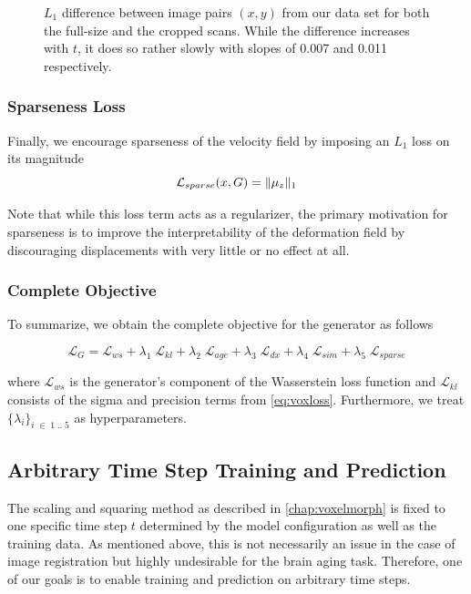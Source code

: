 \begin{figure}[h]
	\caption{$L_1$ difference between image pairs $(x, y)$ from our data set for both the full-size and the cropped scans. While the difference increases with $t$, it does so rather slowly with slopes of 0.007 and 0.011 respectively.}
	\label{fig:l1plots}
\end{figure}

\subsubsection*{Sparseness Loss}
Finally, we encourage sparseness of the velocity field by imposing an $L_1$ loss on its magnitude
\begin{equation}
	\mathcal{L}_{sparse}( x, G ) = \lVert\mu_z\rVert_1
\end{equation}

Note that while this loss term acts as a regularizer, the primary motivation for sparseness is to improve the interpretability of the deformation field by discouraging displacements with very little or no effect at all.

\subsubsection*{Complete Objective}
To summarize, we obtain the complete objective for the generator as follows

\begin{equation}
	\mathcal{L}_G =
		\mathcal{L}_{ws} +
		\lambda_{1} \; \mathcal{L}_{kl} +
		\lambda_{2} \; \mathcal{L}_{age} + 
		\lambda_{3} \; \mathcal{L}_{dx} + 
		\lambda_{4} \; \mathcal{L}_{sim} + 
		\lambda_{5} \; \mathcal{L}_{sparse}
\end{equation}

where $\mathcal{L}_{ws}$ is the generator's component of the Wasserstein loss function and $\mathcal{L}_{kl}$ consists of the sigma and precision terms from \autoref{eq:voxloss}. Furthermore, we treat $ \{ \lambda_i \}_{i\;\in\;1\;..\;5}$ as hyperparameters.

\subsection{Arbitrary Time Step Training and Prediction} \label{sec:adaarbtimestep}
The scaling and squaring method as described in \autoref{chap:voxelmorph} is fixed to one specific time step $t$ determined by the model configuration as well as the training data. As mentioned above, this is not necessarily an issue in the case of image registration but highly undesirable for the brain aging task. Therefore, one of our goals is to enable training and prediction on arbitrary time steps.

